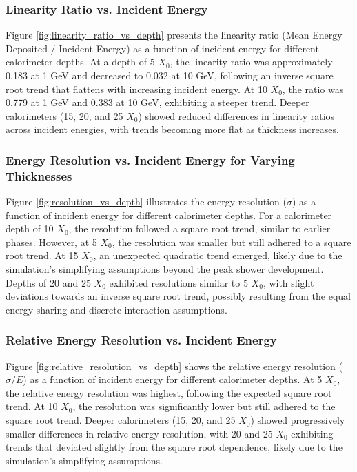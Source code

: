 \documentclass[twocolumn]{aastex631}
\begin{document}
\subsubsection{Linearity Ratio vs. Incident Energy}

Figure \ref{fig:linearity_ratio_vs_depth} presents the linearity ratio (Mean Energy Deposited / Incident Energy) as a function of incident energy for different calorimeter depths. At a depth of 5 \(X_0\), the linearity ratio was approximately 0.183 at 1 GeV and decreased to 0.032 at 10 GeV, following an inverse square root trend that flattens with increasing incident energy. At 10 \(X_0\), the ratio was 0.779 at 1 GeV and 0.383 at 10 GeV, exhibiting a steeper trend. Deeper calorimeters (15, 20, and 25 \(X_0\)) showed reduced differences in linearity ratios across incident energies, with trends becoming more flat as thickness increases.

\subsubsection{Energy Resolution vs. Incident Energy for Varying Thicknesses}

Figure \ref{fig:resolution_vs_depth} illustrates the energy resolution (\(\sigma\)) as a function of incident energy for different calorimeter depths. For a calorimeter depth of 10 \(X_0\), the resolution followed a square root trend, similar to earlier phases. However, at 5 \(X_0\), the resolution was smaller but still adhered to a square root trend. At 15 \(X_0\), an unexpected quadratic trend emerged, likely due to the simulation's simplifying assumptions beyond the peak shower development. Depths of 20 and 25 \(X_0\) exhibited resolutions similar to 5 \(X_0\), with slight deviations towards an inverse square root trend, possibly resulting from the equal energy sharing and discrete interaction assumptions.

\subsubsection{Relative Energy Resolution vs. Incident Energy}

Figure \ref{fig:relative_resolution_vs_depth} shows the relative energy resolution (\(\sigma/E\)) as a function of incident energy for different calorimeter depths. At 5 \(X_0\), the relative energy resolution was highest, following the expected square root trend. At 10 \(X_0\), the resolution was significantly lower but still adhered to the square root trend. Deeper calorimeters (15, 20, and 25 \(X_0\)) showed progressively smaller differences in relative energy resolution, with 20 and 25 \(X_0\) exhibiting trends that deviated slightly from the square root dependence, likely due to the simulation's simplifying assumptions.
\end{document}
